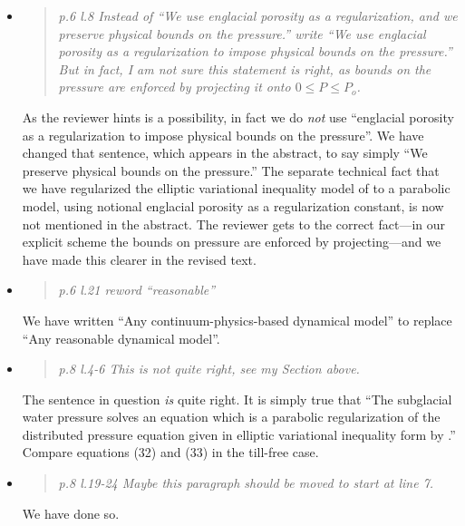 \documentclass[11pt,reqno]{amsart}
\newcommand{\reply}[2]{
\medskip\medskip
\item  \begin{quote}
\emph{#1}
\end{quote}

\medskip
\noindent #2}
\begin{document}
\begin{itemize}
\reply{p.6 l.8 Instead of ``We use englacial porosity as a regularization, and we preserve
physical bounds on the pressure.'' write ``We use englacial porosity as a regularization to impose physical bounds on the pressure.''  But in fact, I am not sure this statement is right, as bounds on the pressure are enforced by projecting it onto $0 \le P \le P_o$.}
{As the reviewer hints is a possibility, in fact we do \emph{not} use ``englacial porosity as a regularization to impose physical bounds on the pressure''.  We have changed that sentence, which appears in the abstract, to say simply ``We preserve physical bounds on the pressure.''  The separate technical fact that we have regularized the elliptic variational inequality model of \cite{Schoofetal2012} to a parabolic model, using notional englacial porosity as a regularization constant, is now not mentioned in the abstract.  The reviewer gets to the correct fact---in our explicit scheme the bounds on pressure are enforced by projecting---and we have made this clearer in the revised text.}

\reply{p.6 l.21 reword ``reasonable''}
{We have written ``Any continuum-physics-based dynamical model'' to replace ``Any reasonable dynamical model''.}

\reply{p.8 l.4-6 This is not quite right, see my Section above.}
{The sentence in question \emph{is} quite right.  It is simply true that ``The subglacial water pressure solves an equation which is a parabolic regularization of the distributed pressure equation given in elliptic variational inequality form by \cite{Schoofetal2012}.''  Compare equations (32) and (33) in the till-free case.}

\reply{p.8 l.19-24 Maybe this paragraph should be moved to start at line 7.}
{We have done so.}


\end{itemize}
\end{document}
